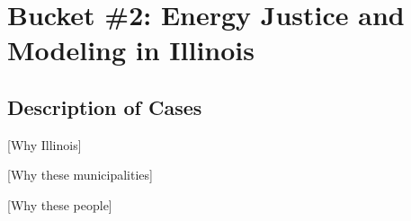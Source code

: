 \section{Bucket \#2: Energy Justice and Modeling in Illinois}

\subsection{Description of Cases}

[Why Illinois]

[Why these municipalities]

[Why these people]

